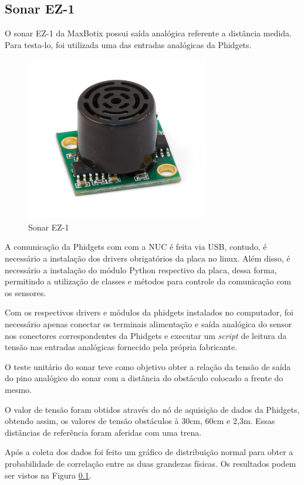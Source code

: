 	\subsection{Sonar EZ-1}
		O sonar EZ-1 da MaxBotix possui saída analógica referente a distância medida. Para testa-lo, foi utilizada uma das entradas analógicas da Phidgets.
		
		
		\begin{figure}[!ht]
		   \centering
		   \includegraphics[width=8cm]{Figures/ez1.jpg}
		   \caption{Sonar EZ-1}
		   \label{fig:ez1}
		\end{figure}
		
		A comunicação da Phidgets com com a NUC é feita via USB, contudo, é necessário a instalação dos drivers obrigatórios da placa no linux. Além disso, é necessário a instalação do módulo Python respectivo da placa, dessa forma, permitindo a utilização de classes e métodos para controle da comunicação com os sensores.
		
		Com os respectivos drivers e módulos da phidgets instalados no computador, foi necessário apenas conectar os terminais alimentação e saída analógica do sensor nos conectores correspondentes da Phidgets e executar um \textit{script} de leitura da tensão nas entradas analógicas fornecido pela própria fabricante. 
		
		O teste unitário do sonar teve como objetivo obter a relação da tensão de saída do pino analógico do sonar com a distância do obstáculo colocado a frente do mesmo.
		
		O valor de tensão foram obtidos através do nó de aquisição de dados da Phidgets, obtendo assim, os valores de tensão obstáculos à 30cm, 60cm e 2,3m. Essas distâncias de referência foram aferidas com uma trena.
		
		Após a coleta dos dados foi feito um gráfico de distribuição normal para obter a probabilidade de correlação entre as duas grandezas físicas. Os resultados podem ser vistos na Figura \ref{}.
	
